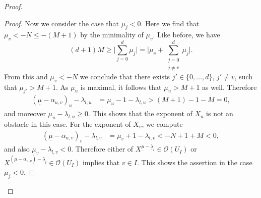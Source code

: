 \documentclass[a4paper, reqno, 10pt]{amsart}
\theoremstyle{definition}
\numberwithin{equation}{section}
\newcommand{\ul}[1]{{\underline{#1}}}
\newcommand{\CO}{{\mathcal {O}}}
\begin{document}
\begin{proof}
\begin{proof}
		
		Now we consider the case that $\mu_j < 0$.
		Here we find that $\mu_v < - N \leq -(M+1)$ by the minimality of $\mu_v$.
		Like before, we have
		\begin{equation*}
			(d+1) M \geq \bigg\lvert \sum_{j=0}^d \mu_j \bigg\rvert = \bigg\lvert \mu_v + \sum_{\substack{j=0 \\ j\neq v}}^d \mu_j \bigg\rvert.
		\end{equation*}
		From this and $\mu_v < -N$ we conclude that there exists $j' \in \{0,\ldots,d\}$, $j' \neq v$, such that $\mu_{j'}>M+1$.
		As $\mu_u$ is maximal, it follows that $\mu_u >M+1$ as well.
		Therefore
		\begin{align*}
			(\ul{\mu}-\alpha_{u,v})_u - \lambda_{l,u} 
			&= \mu_u -1 - \lambda_{l,u}
			> (M+1) - 1 - M
			= 0 ,
		\end{align*}
		and moreover $\mu_u - \lambda_{l,u} \geq 0$.
		This shows that the exponent of $X_u$ is not an obstacle in this case.
		For the exponent of $X_v$, we compute
		\begin{align*}
			(\ul{\mu}-\alpha_{u,v})_v - \lambda_{l,v} 
			&= \mu_v +1 - \lambda_{l,v}
			< -N + 1 +M
			< 0 ,
		\end{align*}
		and also $\mu_v - \lambda_{l,v} <0$.
		Therefore either of $X^{\ul{\mu}-\ul{\lambda}_l} \in \CO(U_I)$ or $X^{(\ul{\mu}-\alpha_{u,v})-\ul{\lambda}_l} \in \CO(U_I)$ implies that $v\in I$.
		This shows the assertion in the case $\mu_j<0$.
	\end{proof}
	

\end{proof}
\end{document}
